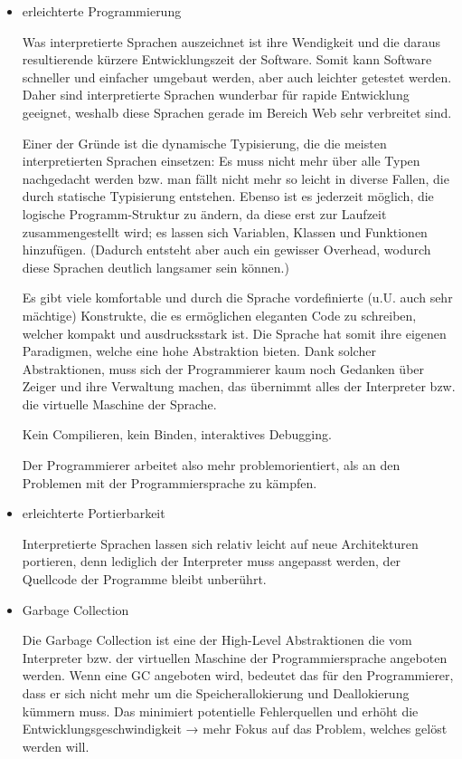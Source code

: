 \begin{itemize}

  \item erleichterte Programmierung

        Was interpretierte Sprachen auszeichnet ist ihre Wendigkeit und die
        daraus resultierende kürzere Entwicklungszeit der Software. Somit kann
        Software schneller und einfacher umgebaut werden, aber auch leichter
        getestet werden. Daher sind interpretierte Sprachen wunderbar für
        rapide Entwicklung geeignet, weshalb diese Sprachen gerade im Bereich
        Web sehr verbreitet sind.

        Einer der Gründe ist die dynamische Typisierung, die die meisten
        interpretierten Sprachen einsetzen: Es muss nicht mehr über alle Typen
        nachgedacht werden bzw. man fällt nicht mehr so leicht in diverse
        Fallen, die durch statische Typisierung entstehen. Ebenso ist es
        jederzeit möglich, die logische Programm-Struktur zu ändern, da diese
        erst zur Laufzeit zusammengestellt wird; es lassen sich Variablen,
        Klassen und Funktionen hinzufügen. (Dadurch entsteht aber auch ein
        gewisser Overhead, wodurch diese Sprachen deutlich langsamer sein
        können.)

        Es gibt viele komfortable und durch die Sprache vordefinierte (u.U.
        auch sehr mächtige) Konstrukte, die es ermöglichen eleganten Code zu
        schreiben, welcher kompakt und ausdrucksstark ist. Die Sprache hat
        somit ihre eigenen Paradigmen, welche eine hohe Abstraktion bieten.
        Dank solcher Abstraktionen, muss sich der Programmierer kaum  noch
        Gedanken über Zeiger und ihre Verwaltung machen, das übernimmt alles
        der Interpreter bzw. die virtuelle Maschine der Sprache.

        Kein Compilieren, kein Binden, interaktives Debugging.

        Der Programmierer arbeitet also mehr problemorientiert, als an den
        Problemen mit der Programmiersprache zu kämpfen.

  \item erleichterte Portierbarkeit

        Interpretierte Sprachen lassen sich relativ leicht auf neue
        Architekturen portieren, denn lediglich der Interpreter muss angepasst
        werden, der Quellcode der Programme bleibt unberührt.

  \item Garbage Collection

        Die Garbage Collection ist eine der High-Level Abstraktionen die vom
        Interpreter bzw. der virtuellen Maschine der Programmiersprache
        angeboten werden. Wenn eine GC angeboten wird, bedeutet das für den
        Programmierer, dass er sich nicht mehr um die Speicherallokierung und
        Deallokierung kümmern muss. Das minimiert potentielle Fehlerquellen
        und erhöht die Entwicklungsgeschwindigkeit → mehr Fokus auf das
        Problem, welches gelöst werden will.

\end{itemize}


